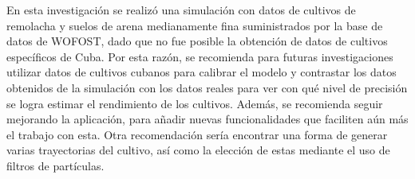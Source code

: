 \begin{recomendations}
	En esta	investigación se realizó una simulación con datos de cultivos de remolacha y suelos de arena medianamente fina suministrados por la base de datos de WOFOST, dado que no fue posible la obtención de datos de cultivos específicos de Cuba. Por esta razón, se recomienda para futuras investigaciones utilizar datos de cultivos cubanos para calibrar el modelo y contrastar los datos obtenidos de la simulación con los datos reales para ver con qué nivel de precisión se logra estimar el rendimiento de los cultivos. Además, se recomienda seguir mejorando la aplicación, para añadir nuevas funcionalidades que faciliten aún más el trabajo con esta. Otra recomendación sería encontrar una forma de generar varias trayectorias del cultivo, así como la elección de estas mediante el uso de filtros de partículas.
\end{recomendations}
